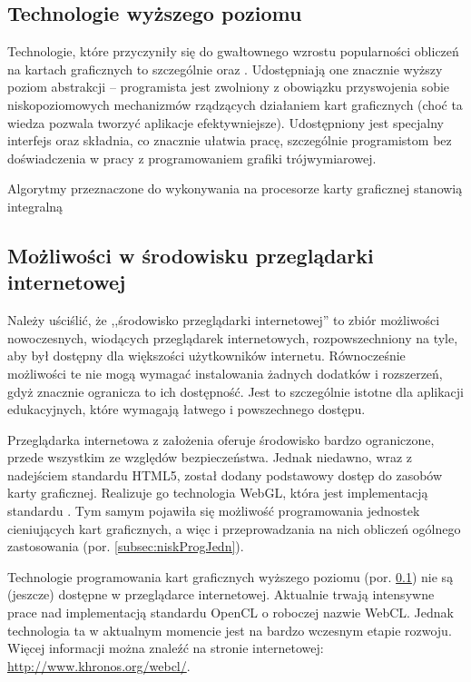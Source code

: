 \subsection{Technologie wyższego poziomu}
\label{subsec:techWyzPoz}

Technologie, które przyczyniły się do gwałtownego wzrostu popularności obliczeń
na kartach graficznych to szczególnie  oraz .
Udostępniają  one znacznie wyższy poziom abstrakcji -- programista jest
zwolniony z obowiązku przyswojenia sobie niskopoziomowych mechanizmów rządzących
działaniem kart graficznych (choć ta wiedza pozwala tworzyć aplikacje
efektywniejsze). Udostępniony jest specjalny interfejs oraz składnia, co
znacznie ułatwia pracę, szczególnie programistom bez doświadczenia w pracy z
programowaniem grafiki trójwymiarowej.

Algorytmy przeznaczone do wykonywania na procesorze karty graficznej stanowią
integralną

\subsection{Możliwości w środowisku przeglądarki internetowej}
\label{subsec:srodPrzegInt}

Należy uściślić, że ,,środowisko przeglądarki internetowej'' to zbiór możliwości
nowoczesnych, wiodących przeglądarek internetowych, rozpowszechniony na tyle,
aby był dostępny dla większości użytkowników internetu. Równocześnie możliwości
te nie mogą wymagać instalowania żadnych dodatków i rozszerzeń, gdyż znacznie
ogranicza to ich dostępność. Jest to szczególnie istotne dla aplikacji
edukacyjnych, które wymagają łatwego i powszechnego dostępu.

Przeglądarka internetowa z założenia oferuje środowisko bardzo ograniczone,
przede wszystkim ze względów bezpieczeństwa. Jednak niedawno, wraz z
nadejściem standardu HTML5, został dodany podstawowy dostęp do zasobów karty
graficznej. Realizuje go technologia WebGL, która jest implementacją standardu
. Tym samym pojawiła się możliwość programowania jednostek
cieniujących kart graficznych, a więc i przeprowadzania na nich obliczeń
ogólnego zastosowania (por. \ref{subsec:niskProgJedn}).

Technologie programowania kart graficznych wyższego poziomu (por.
\ref{subsec:techWyzPoz}) nie są (jeszcze) dostępne w przeglądarce
internetowej. Aktualnie trwają intensywne prace nad implementacją standardu
OpenCL o roboczej nazwie WebCL. Jednak technologia ta w aktualnym momencie
jest na bardzo wczesnym etapie rozwoju. Więcej informacji można znaleźć na
stronie internetowej: \url{http://www.khronos.org/webcl/}.


